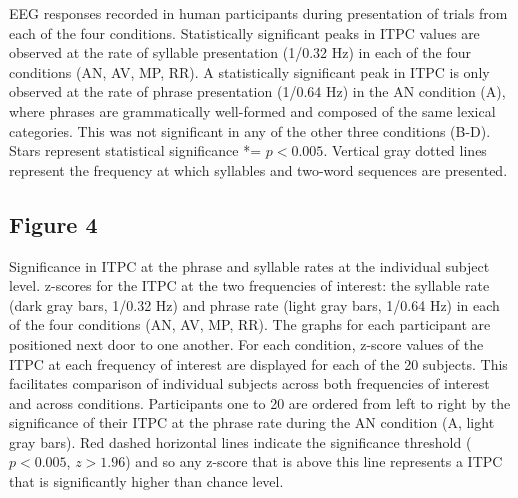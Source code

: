 \documentclass[10pt,letterpaper]{article}
\begin{document}
EEG responses recorded in human participants during presentation of trials from each of the four conditions. Statistically significant peaks in ITPC values are observed at the rate of syllable presentation (1/0.32 Hz) in each of the four conditions (AN, AV, MP, RR). A statistically significant peak in ITPC is only observed at the rate of phrase presentation (1/0.64 Hz) in the AN condition (A), where phrases are grammatically well-formed and composed of the same  lexical categories. This was not significant in any of the other three conditions (B-D). Stars represent statistical significance *= $p<0.005$. Vertical gray dotted lines represent the frequency at which syllables and two-word sequences are presented.

\subsection*{Figure 4}

Significance in ITPC at the phrase and syllable rates at the individual subject level. z-scores for the ITPC at the two frequencies of interest: the syllable rate (dark gray bars, 1/0.32 Hz) and phrase rate (light gray bars, 1/0.64 Hz) in each of the four conditions (AN, AV, MP, RR). The graphs for each participant are positioned next door to one another. For each condition, z-score values of the ITPC at each frequency of interest are displayed for each of the 20 subjects. This facilitates comparison of individual subjects across both frequencies of interest and across conditions. Participants one to 20 are ordered from left to right by the significance of their ITPC at the phrase rate during the AN condition (A, light gray bars). Red dashed horizontal lines indicate the significance threshold ($p<0.005$, $z>1.96$) and so any z-score that is above this line represents a  ITPC that is significantly higher than chance level.
\end{document}
